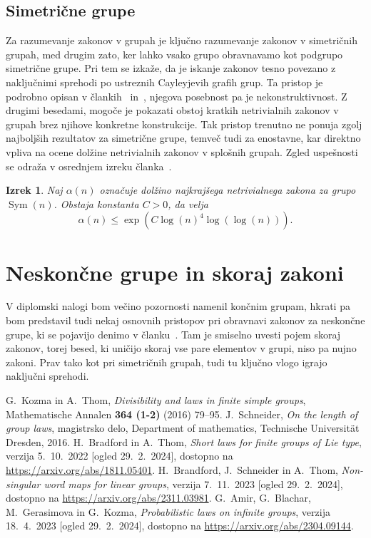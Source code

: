 \documentclass[12pt,a4paper]{article}
\newcounter{theoremcounter}[section] %
\newtheorem{izrek}[theoremcounter]{Izrek}
\begin{document}
\subsection{Simetrične grupe}
Za razumevanje zakonov v grupah je ključno razumevanje zakonov v simetričnih grupah, med drugim zato, ker lahko vsako grupo obravnavamo kot podgrupo simetrične grupe. Pri tem se izkaže, da je iskanje zakonov tesno povezano z naključnimi sprehodi po ustreznih Cayleyjevih grafih grup.
Ta pristop je podrobno opisan v člankih~\cite{Kozma_Thom_2016} in~\cite{Amir_Blachar_Gerasimova_Kozma_2023}, njegova posebnost pa je nekonstruktivnost. Z drugimi besedami, mogoče je pokazati
obstoj kratkih netrivialnih zakonov v grupah brez njihove konkretne konstrukcije. Tak pristop trenutno ne ponuja zgolj najboljših rezultatov za simetrične grupe, temveč tudi za enostavne, kar direktno vpliva
na ocene dolžine netrivialnih zakonov v splošnih grupah. Zgled uspešnosti se odraža v osrednjem izreku članka~\cite{Kozma_Thom_2016}.
\begin{izrek}
Naj $\alpha(n)$ označuje dolžino najkrajšega netrivialnega zakona za grupo $\operatorname{Sym}(n)$. Obstaja konstanta $C > 0$, da velja \begin{equation*}
\alpha(n) \le  \exp \left( C {\log(n)}^{4} \log(\log(n)) \right).
\end{equation*}  
\end{izrek}


\section{Neskončne grupe in skoraj zakoni}
V diplomski nalogi bom večino pozornosti namenil končnim grupam, hkrati pa bom predstavil tudi nekaj osnovnih pristopov pri obravnavi zakonov za neskončne grupe, ki se pojavijo denimo v članku~\cite{Amir_Blachar_Gerasimova_Kozma_2023}.  
Tam je smiselno uvesti pojem skoraj zakonov, torej besed, ki uničijo skoraj vse pare elementov v grupi, niso pa nujno zakoni. Prav tako kot pri simetričnih grupah, tudi tu ključno vlogo igrajo naključni sprehodi.  



\begin{thebibliography}{5}
    G.~Kozma in A.~Thom, \emph{Divisibility and laws in finite simple groups}, Mathematische Annalen \textbf{364 (1-2)} (2016) 79--95. 
     J.~Schneider, \emph{On the length of group laws}, magistrsko delo, Department of mathematics, Technische Universität Dresden, 2016.
     H.~Bradford in A.~Thom, \emph{Short laws for finite groups of Lie type}, verzija 5.~10.~2022 [ogled 29.~2.~2024], dostopno na \url{https://arxiv.org/abs/1811.05401}.
     H.~Brandford, J.~Schneider in A.~Thom, \emph{Non-singular word maps for linear groups}, verzija 7.~11.~2023 [ogled 29.~2.~2024], dostopno na \url{https://arxiv.org/abs/2311.03981}. 
     G.~Amir, G.~Blachar, M.~Gerasimova in G.~Kozma, \emph{Probabilistic laws on infinite groups}, verzija 18.~4.~2023 [ogled 29.~2.~2024], dostopno na \url{https://arxiv.org/abs/2304.09144}. 
    \end{thebibliography}
\end{document}
